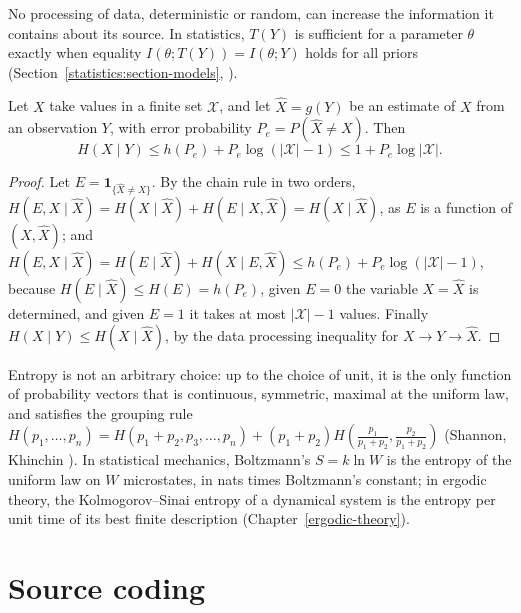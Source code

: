 No processing of data, deterministic or random, can increase the information it contains about its source. In statistics, $T(Y)$ is sufficient for a parameter $\theta$ exactly when equality $I(\theta; T(Y)) = I(\theta; Y)$
holds for all priors (Section~\ref{statistics:section-models}, \cite{cover-thomas}).

\begin{theorem}\label{information-theory:theorem-fano}
Let $X$ take values in a finite set $\mathcal{X}$, and let $\hat X = g(Y)$ be an estimate of $X$ from an observation $Y$, with error probability $P_e = P(\hat X \neq X)$. Then
\[
H(X \mid Y) \leq h(P_e) + P_e\log(|\mathcal{X}| - 1) \leq 1 + P_e\log|\mathcal{X}|.
\]
\end{theorem}

\begin{proof}
Let $E = \mathbf{1}_{\{\hat X \neq X\}}$. By the chain rule in two orders, $H(E, X \mid \hat X) = H(X \mid \hat X) + H(E \mid X, \hat X) = H(X \mid \hat X)$, as $E$ is a function of $(X, \hat X)$; and
$H(E, X \mid \hat X) = H(E \mid \hat X) + H(X \mid E, \hat X) \leq h(P_e) + P_e\log(|\mathcal{X}| - 1)$, because $H(E \mid \hat X) \leq H(E) = h(P_e)$, given $E = 0$ the variable $X = \hat X$ is determined, and given $E = 1$ it takes at most
$|\mathcal{X}| - 1$ values. Finally $H(X \mid Y) \leq H(X \mid \hat X)$, by the data processing inequality for $X \to Y \to \hat X$.
\end{proof}

\begin{remark}\label{information-theory:remark-axioms}
Entropy is not an arbitrary choice: up to the choice of unit, it is the only function of probability vectors that is continuous, symmetric, maximal at the uniform law, and satisfies the grouping rule
$H(p_1, \ldots, p_n) = H(p_1 + p_2, p_3, \ldots, p_n) + (p_1 + p_2)H(\frac{p_1}{p_1 + p_2}, \frac{p_2}{p_1 + p_2})$ (Shannon, Khinchin \cite{cover-thomas}). In statistical mechanics, Boltzmann's $S = k\ln W$ is the entropy of the uniform law
on $W$ microstates, in nats times Boltzmann's constant; in ergodic theory, the Kolmogorov--Sinai entropy of a dynamical system is the entropy per unit time of its best finite description (Chapter~\ref{ergodic-theory}).
\end{remark}

\section{Source coding}\label{information-theory:section-source-coding}

